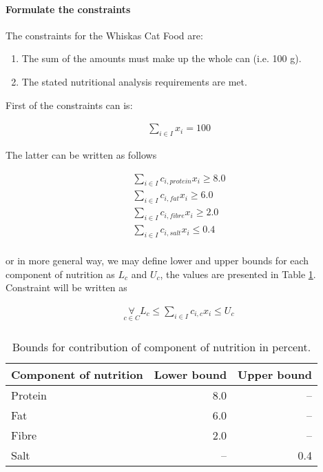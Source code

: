 \paragraph{Formulate the constraints}

The constraints for the Whiskas Cat Food are:

\begin{enumerate}
  \item The sum of the amounts must make up the whole can (i.e. 100 g).
  \item The stated nutritional analysis requirements are met.
\end{enumerate}

First of the constraints can is: 

\begin{align}
   \mathop\sum\limits_{i \in I} x_i = 100
\end{align}

The latter can be written as follows

\begin{align}
   \mathop\sum\limits_{i \in I} c_{i,protein} x_i \geq 8.0 \\
   \mathop\sum\limits_{i \in I} c_{i,fat} x_i \geq 6.0 \\
   \mathop\sum\limits_{i \in I} c_{i,fibre} x_i \geq 2.0 \\ 
   \mathop\sum\limits_{i \in I} c_{i,salt} x_i \leq 0.4 \\
\end{align}

or in more general way, we may define lower and upper bounds for each component of nutrition as $L_c$ and $U_c$, the values are presented in Table \ref{ampl:whiskas:bounds}. Constraint will be written as

\begin{align}
   \mathop\forall\limits_{c \in C} L_c \leq \mathop\sum\limits_{i \in I} c_{i,c} x_i \leq U_c \\
\end{align}

\begin{table}
  \centering
  \begin{tabular}{| l | r | r |}
    \hline
    \textbf{Component of nutrition} & \textbf{Lower bound} & \textbf{Upper bound} \\ \hline
    Protein & 8.0 & -- \\ \hline
    Fat & 6.0 & -- \\ \hline
    Fibre & 2.0 & -- \\ \hline
    Salt & -- & 0.4 \\ \hline
  \end{tabular}
  \caption{Bounds for contribution of component of nutrition in percent.}
  \label{ampl:whiskas:bounds}  
\end{table}



